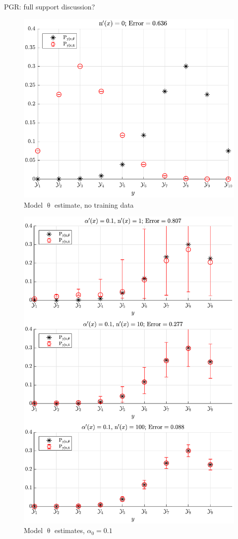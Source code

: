 \documentclass[12pt]{article}
\begin{document}
PGR: full support discussion?


\begin{figure}
\centering
\includegraphics[width=0.7\linewidth]{P_yx_error_N_0.pdf}
\caption{Model $\uptheta$ estimate, no training data}
\label{fig:P_yx_error_N_0}
\end{figure}

\begin{figure}
\centering
\includegraphics[width=0.7\linewidth]{P_yx_error_a0_0_1.pdf}
\caption{Model $\uptheta$ estimates, $\alpha_0 = 0.1$}
\label{fig:P_yx_error_a0_0_1}
\end{figure}
\end{document}
